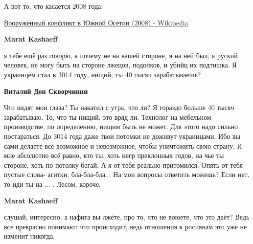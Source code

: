 \begin{itemize}
\begin{itemize}
А вот то, что касается 2008 года:

\href{https://ru.wikipedia.org/wiki/Вооружённый_конфликт_в_Южной_Осетии_(2008)}{%
Вооружённый конфликт в Южной Осетии (2008) - Wikipedia%
}

 
\textbf{Marat Kashaeff} 

я тебе ещё раз говорю, я почему не на вашей стороне, я на ней был, я руский
человек, не могу быть на стороне лжецов, подонков, и убийц их подтишка. Я
украинцем стал в 3014 году, нищий, ты 40 тысяч зарабатываешь?


 
\textbf{Виталий Дон Скворчинни} 

Что видят мои глаза? Ты накатил с утра, что ли? Я гораздо больше 40 тысяч
зарабатываю. То, что ты нищий, это вряд ли. Технолог на мебельном производстве,
по определению, нищим быть не может. Для этого надо сильно постараться. До 3014
года даже твои потомки не доживут украинцами. Ибо вы сами делаете всё возможное
и невозможное, чтобы уничтожить свою страну. И мне абсолютно всё равно, кто ты,
хоть негр преклонных годов, на чье ты стороне, хоть по потолку бегай. А я от
тебя реально притомился. Опять от тебя пустые слова- агитки, бла-бла-бла... На
мои вопросы ответить можешь? Если нет, то иди ты на ... . Лесом, короче.

 
\textbf{Marat Kashaeff} 

слушай, интересно, а нафига вы лжёте, про то, что не воюете, что это даёт? Ведь
все прекрасно понимают что происходит, ведь отношения к росиянам это уже не
изменит никогда.


 

\end{itemize}
\end{itemize}
